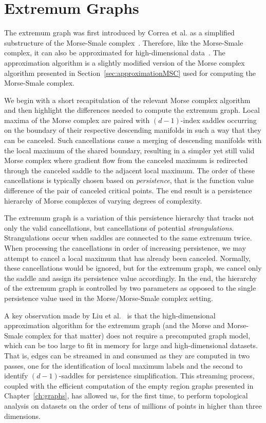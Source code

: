 \section{Extremum Graphs}
\label{sec:extremumGraph}

The extremum graph was first introduced by Correa et al. as a simplified substructure of the Morse-Smale complex~\cite{CorreaLindstromBremer2011}.
%
Therefore, like the Morse-Smale complex, it can also be approximated for high-dimensional data~\cite{CorreaLindstromBremer2011,ThomasNatarajan2013}.
%
The approximation algorithm is a slightly modified version of the Morse complex algorithm presented in Section~\ref{sec:approximationMSC} used for computing the Morse-Smale complex.

We begin with a short recapitulation of the relevant Morse complex algorithm and then highlight the differences needed to compute the extremum graph.
%
Local maxima of the Morse complex are paired with $(d-1)$-index saddles occurring on the boundary of their respective descending manifolds in such a way that they can be canceled.
%
Such cancellations cause a merging of descending manifolds with the local maximum of the shared boundary, resulting in a simpler yet still valid Morse complex where gradient flow from the canceled maximum is redirected through the canceled saddle to the adjacent local maximum.
%
The order of these cancellations is typically chosen based on \textit{persistence}, that is the function value difference of the pair of canceled critical points.
%
The end result is a persistence hierarchy of Morse complexes of varying degrees of complexity.

The extremum graph is a variation of this persistence hierarchy that tracks not only the valid cancellations, but cancellations of potential \textit{strangulations}.
%
Strangulations occur when saddles are connected to the same extremum twice.
%
When processing the cancellations in order of increasing persistence, we may attempt to cancel a local maximum that has already been canceled.
%
Normally, these cancellations would be ignored, but for the extremum graph, we cancel only the saddle and assign its persistence value accordingly.
%
In the end, the hierarchy of the extremum graph is controlled by two parameters as opposed to the single persistence value used in the Morse/Morse-Smale complex setting.

A key observation made by Liu et al.~\cite{LiuWangMaljovec2019} is that the high-dimensional approximation algorithm for the extremum graph (and the Morse and Morse-Smale complex for that matter) does not require a precomputed graph model, which can be too large to fit in memory for large and high-dimensional datasets.
%
That is, edges can be streamed in and consumed as they are computed in two passes, one for the identification of local maximum labels and the second to identify $(d-1)$-saddles for persistence simplification.
%
This streaming process, coupled with the efficient computation of the empty region graphs presented in Chapter~\ref{ch:graphs}, has allowed us, for the first time, to perform topological analysis on datasets on the order of tens of millions of points in higher than three dimensions.

% 